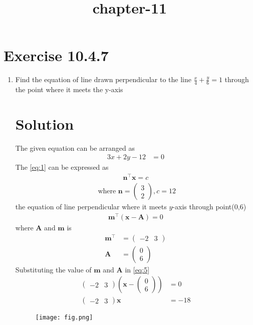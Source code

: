 \documentclass[12pt]{article}
\providecommand{\brak}[1]{\ensuremath{\left(#1\right)}}
\newcommand{\myvec}[1]{\ensuremath{\begin{pmatrix}#1\end{pmatrix}}}
\let\vec\mathbf
\begin{document}
\begin{center}
\title{\textbf{chapter-11}}
\date{\vspace{-5ex}} %
\maketitle
\end{center}
\setcounter{page}{1}
\section{Exercise 10.4.7}

\begin{enumerate}
\item Find the equation of line  drawn perpendicular to the line $\frac{x}{4}+\frac{y}{6}=1$ through the point where it meets the y-axis \\
\section{Solution} The given equation can be arranged as
\begin{align}
3x+2y-12&=0 \label{eq:1}
\end{align}
The \eqref{eq:1} can be expressed as  
\begin{align}
	\vec{n}^{\top}\vec{x}=c
\end{align}
\begin{align}
	\text{ where }
		\vec{n} = \myvec{3\\2}, c=12 
\end{align}
the equation of line perpendicular where it meets $y$-axis through point(0,6)
\begin{align}
	\vec{m}^\top\brak{\vec{x}-\vec{A}}=0\label{eq:5}
\end{align}
		where $\vec{A}$ and $\vec{m}$ is 
\begin{align}
	\vec{m}^{\top} &=\myvec{-2 & 3}\\
	\vec{A} &=\myvec{0\\6}
\end{align}
Substituting the value of $\vec{m}$ and $\vec{A}$ in \eqref{eq:5}
		\begin{align}
			\myvec{-2 & 3}\brak{\vec{x}-\myvec{0\\6}} &=0\\
			\myvec{-2 & 3}\vec{x} &=-18
		\end{align}
\begin{figure}[h]
\texttt{[image: fig.png]}
\caption{}
  \label{fig:Figure}
\end{figure}
\end{enumerate}
\end{document}
